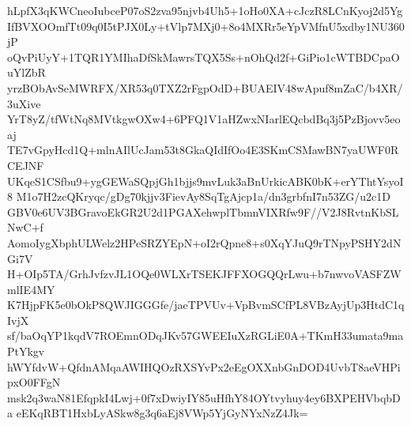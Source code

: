 hLpfX3qKWCneoIubceP07oS2zva95njvb4Uh5+1oHo0XA+cJczR8LCnKyoj2d5Yg
IfBVXOOmfTt09q0I5tPJX0Ly+tVlp7MXj0+8o4MXRr5eYpVMfnU5xdby1NU360jP
oQvPiUyY+1TQR1YMIhaDfSkMawrsTQX5Ss+nOhQd2f+GiPio1cWTBDCpaOuYlZbR
yrzBObAvSeMWRFX/XR53q0TXZ2rFgpOdD+BUAEIV48wApuf8mZaC/b4XR/3uXive
YrT8yZ/tfWtNq8MVtkgwOXw4+6PFQ1V1aHZwxNIarlEQcbdBq3j5PzBjovv5eoaj
TE7vGpyHcd1Q+mlnAIlUcJam53t8GkaQIdIfOo4E3SKmCSMawBN7yaUWF0RCEJNF
UKqeS1CSfbu9+ygGEWaSQpjGh1bjjs9mvLuk3aBnUrkicABK0bK+erYThtYsyoI8
M1o7H2zcQKryqc/gDg70kjjv3FievAy8SqTgAjcp1a/dn3grbfnI7n53ZG/u2c1D
GBV0e6UV3BGravoEkGR2U2d1PGAXehwplTbmnVIXRfw9F//V2J8RvtnKbSLNwC+f
AomoIygXbphULWelz2HPeSRZYEpN+oI2rQpne8+s0XqYJuQ9rTNpyPSHY2dNGi7V
H+OIp5TA/GrhJvfzvJL1OQe0WLXrTSEKJFFXOGQQrLwu+b7nwvoVASFZWmlIE4MY
K7HjpFK5e0bOkP8QWJIGGGfe/jaeTPVUv+VpBvmSCfPL8VBzAyjUp3HtdC1qIvjX
sf/baOqYP1kqdV7ROEmnODqJKv57GWEEIuXzRGLiE0A+TKmH33umata9maPtYkgv
hWYfdvW+QfdnAMqaAWIHQOzRXSYvPx2eEgOXXnbGnDOD4UvbT8aeVHPipxO0FFgN
msk2q3waN81EfqpkI4Lwj+0f7xDwiyIY85uHfhY84OYtvyhuy4ey6BXPEHVbqbDa
eEKqRBT1HxbLyASkw8g3q6aEj8VWp5YjGyNYxNzZ4Jk=
